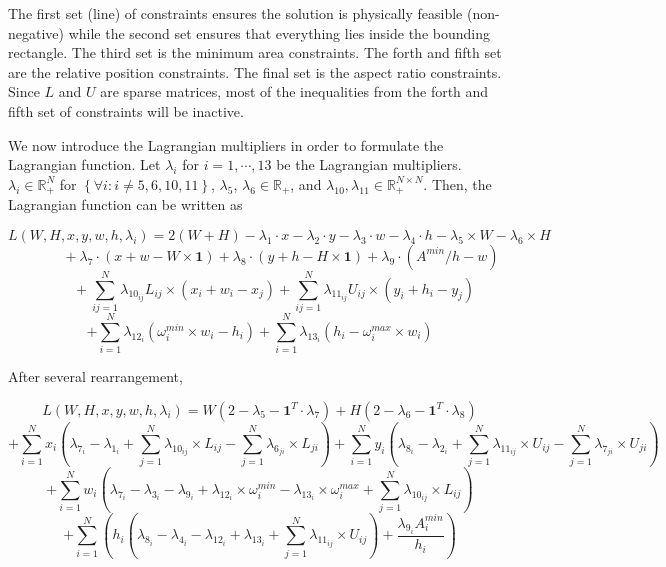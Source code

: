 \documentclass[12pt] {article}
\begin{document}
The first set (line) of constraints ensures the solution is physically feasible (non-negative) while the second set ensures that everything lies inside the bounding rectangle. The third set is the minimum area constraints. The forth and fifth set are the relative position constraints. The final set is the aspect ratio constraints. Since $L$ and $U$ are sparse matrices, most of the inequalities from the forth and fifth set of constraints will be inactive. 

We now introduce the Lagrangian multipliers in order to formulate the Lagrangian function. Let $\lambda_{i}$ for $i=1,\cdots, 13$ be the Lagrangian multipliers. $\lambda_{i} \in \mathbb{R}^{N}_{+}$ for  $\left\lbrace \forall i: i\neq5,6,10,11 \right\rbrace$, $\lambda_{5}$, $\lambda_{6} \in \mathbb{R}_{+}$, and $\lambda_{10}, \lambda_{11}\in \mathbb{R}^{N\times N}_{+}$. Then, the Lagrangian function can be written as 
\begin{small}
$$
L(W,H,x,y,w,h,\lambda_{i}) = 2(W+H) - \lambda_{1}\cdot x - \lambda_{2}\cdot y - \lambda_{3}\cdot w - \lambda_{4}\cdot h - \lambda_{5}\times W -  \lambda_{6}\times H
$$
$$
\quad\qquad +\lambda_{7}\cdot(x+w-W\times\textbf{1})+\lambda_{8}\cdot(y+h-H\times\textbf{1}) + \lambda_{9}\cdot (A^{min}/h-w)
$$
$$
\qquad + \sum_{ij=1}^{N} \lambda_{10_{ij}}L_{ij} \times (x_{i}+w_{i}-x_{j})+ \sum_{ij=1}^{N} \lambda_{11_{ij}}U_{ij} \times (y_{i}+h_{i}-y_{j}) 
$$
$$
+ \sum_{i=1}^{N} \lambda_{12_{i}}\left( \omega_{i}^{min}\times w_{i} - h_{i} \right)
+ \sum_{i=1}^{N} \lambda_{13_{i}}\left( h_{i} - \omega_{i}^{max}\times w_{i} \right)
$$
\end{small}
After several rearrangement, 
\begin{small}
$$
L(W,H,x,y,w,h,\lambda_{i})  = W\left(2-\lambda_{5}- \textbf{1}^{T}\cdot \lambda_{7} \right) + H\left(2-\lambda_{6}- \textbf{1}^{T}\cdot\lambda_{8}\right) 
$$
$$
+\sum_{i=1}^{N}x_{i}\left( \lambda_{7_{i}} -\lambda_{1_{i}} + \sum_{j=1}^{N}\lambda_{10_{ij}}\times L_{ij}-\sum_{j=1}^{N}\lambda_{6_{ji}}\times L_{ji}\right)
  +\sum_{i=1}^{N}y_{i}\left(\lambda_{8_{i}} -\lambda_{2_{i}} + \sum_{j=1}^{N}\lambda_{11_{ij}}\times U_{ij}-\sum_{j=1}^{N}\lambda_{7_{ji}}\times U_{ji}\right)
$$
$$
  +\sum_{i=1}^{N}w_{i}\left(\lambda_{7_{i}} - \lambda_{3_{i}} - \lambda_{9_{i}} + \lambda_{12_{i}}\times \omega_{i}^{min} -\lambda_{13_{i}}\times \omega_{i}^{max} + \sum_{j=1}^{N}\lambda_{10_{ij}}\times L_{ij} \right)  
$$
$$+\sum_{i=1}^{N}\left( h_{i}\left(\lambda_{8_{i}} - \lambda_{4_{i}} -\lambda_{12_{i}}+\lambda_{13_{i}}+ \sum_{j=1}^{N}\lambda_{11_{ij}}\times U_{ij} \right)+\frac{\lambda_{9_{i}}A_{i}^{min}}{h_{i}} \right)
$$
\end{small}
\end{document}
